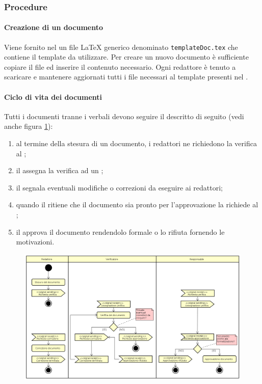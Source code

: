         \subsubsection{Procedure}
            \paragraph{Creazione di un documento}
            Viene fornito nel  un file \LaTeX{} generico denominato \texttt{templateDoc.tex} che contiene il template da utilizzare. Per creare un nuovo documento è sufficiente copiare il file ed inserire il contenuto necessario. Ogni redattore è tenuto a scaricare e mantenere aggiornati tutti i file necessari al template presenti nel .
            \paragraph{Ciclo di vita dei documenti}\label{sec:ciclodivitadoc}
            Tutti i documenti tranne i verbali devono seguire il  descritto di seguito (vedi anche figura \ref{fig:ciclovitadoc}):
            \begin{enumerate}
                \item al termine della stesura di un documento, i redattori ne richiedono la verifica al \responsabile;
                \item il \responsabile{} assegna la verifica ad un \verificatore;
                \item il \verificatore{} segnala eventuali modifiche o correzioni da eseguire ai redattori;
                \item quando il \verificatore{} ritiene che il documento sia pronto per l'approvazione la richiede al \responsabile;
                \item il \responsabile{} approva il documento rendendolo formale o lo rifiuta fornendo le motivazioni.
            \end{enumerate}
            \begin{figure}[h]
		        \includegraphics[width=\textwidth]{img/ciclo_di_vita_doc}
                \label{fig:ciclovitadoc}
	        \end{figure}\mbox{}\\
